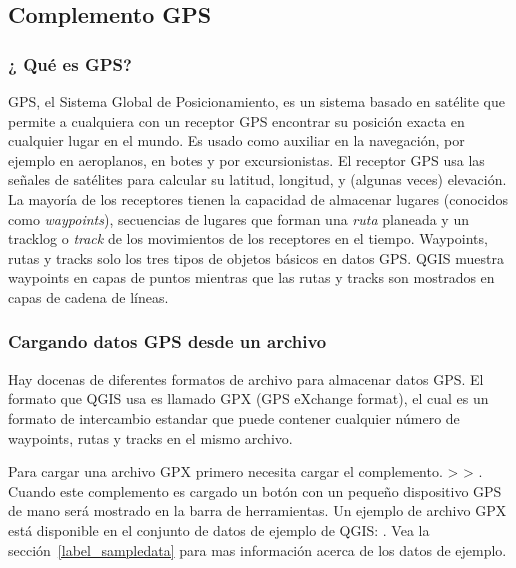 ﻿%

\subsection{Complemento GPS}\label{label_plugingps}


\subsubsection{¿ Qué es GPS?}\label{whatsgps}

GPS, el Sistema Global de Posicionamiento, es un sistema basado en satélite que permite a cualquiera con un receptor GPS encontrar su posición exacta en cualquier lugar en el mundo.
Es usado como auxiliar en la navegación, por ejemplo en aeroplanos, en botes y por excursionistas.
El receptor GPS usa las señales de satélites para calcular su latitud, longitud, y (algunas veces) elevación.
La mayoría de los receptores tienen la capacidad de almacenar lugares (conocidos como \emph{waypoints}), secuencias de lugares que forman una \emph{ruta} planeada y un tracklog o \emph{track} de los movimientos de los receptores en el tiempo.
Waypoints, rutas y tracks solo los tres tipos de objetos básicos en datos GPS.
QGIS muestra waypoints en capas de puntos mientras que las rutas y tracks son mostrados en capas de cadena de líneas.

\subsubsection{Cargando datos GPS desde un archivo}\label{label_loadgps}

Hay docenas de diferentes formatos de archivo para almacenar datos GPS.
El formato que QGIS usa es llamado GPX (GPS eXchange format), el cual es un formato de intercambio estandar que puede contener cualquier número de waypoints, rutas y tracks en el mismo archivo.

Para cargar una archivo GPX  primero necesita cargar el complemento.
 >  > . Cuando este complemento es cargado un botón con un pequeño dispositivo GPS de mano será mostrado en la barra de herramientas. Un ejemplo de archivo GPX está disponible en el conjunto de datos de ejemplo de QGIS:
. Vea 
la sección~\ref{label_sampledata} para mas información acerca de los datos de ejemplo.

